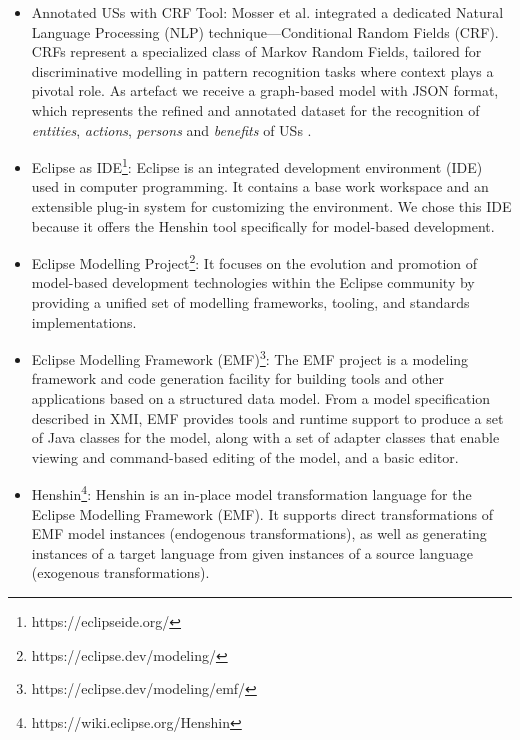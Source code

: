 \begin{itemize}
	\item Annotated USs with CRF Tool: Mosser et al. integrated a dedicated Natural Language Processing (NLP) technique—Conditional Random Fields (CRF). CRFs represent a specialized class of Markov Random Fields, tailored for discriminative modelling in pattern recognition tasks where context plays a pivotal role\cite{arulmohan2023extracting}.
	As artefact we receive a graph-based model with JSON format, which represents the refined and annotated dataset for the recognition of \emph{entities}, \emph{actions}, \emph{persons} and \emph{benefits} of USs \cite{mosser2022modelling}.
	
	
	\item Eclipse as IDE\footnote{https://eclipseide.org/}: Eclipse is an integrated development environment (IDE) used in computer programming. It contains a base work workspace and an extensible plug-in system for customizing the environment.
	We chose this IDE because it offers the Henshin tool specifically for model-based development.
	
	\item Eclipse Modelling Project\footnote{https://eclipse.dev/modeling/}: It focuses on the evolution and promotion of model-based development technologies within the Eclipse community by providing a unified set of modelling frameworks, tooling, and standards implementations.
	
	\item Eclipse Modelling Framework (EMF)\footnote{https://eclipse.dev/modeling/emf/}: The EMF project is a modeling framework and code generation facility for building tools and other applications based on a structured data model. From a model specification described in XMI, EMF provides tools and runtime support to produce a set of Java classes for the model, along with a set of adapter classes that enable viewing and command-based editing of the model, and a basic editor.
	
	\item Henshin\footnote{https://wiki.eclipse.org/Henshin}: Henshin is an in-place model transformation language for the Eclipse Modelling Framework (EMF). It supports direct transformations of EMF model instances (endogenous transformations), as well as generating instances of a target language from given instances of a source language (exogenous transformations).
	

\end{itemize}
